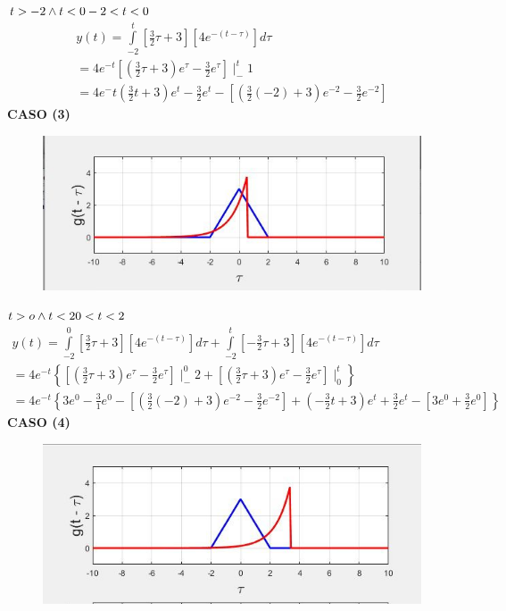 \documentclass[11pt,letterpaper]{article}
\begin{document}
$t>-2 \wedge t<0\\
-2<t<0$
\begin{align}
y(t) = \overset{t}{\underset{-2}{\int }} \left[ \frac{3}{2} \tau + 3 \right] \left[ 4e^{-(t-\tau)} \right]d\tau\\
= 4e^{-t} \left[ \left( \frac{3}{2} \tau + 3 \right) e^\tau - \frac{3}{2} e^\tau \right] \mid^t _-1\\
= 4e^-t  \left( \frac{3}{2}t + 3 \right) e^t - \frac{3}{2} e^t - \left[ \left( \frac{3}{2} (-2) + 3  \right) e^{-2} - \frac{3}{2} e^{-2}  \right]
\end{align}
\textbf{CASO (3)}\\
\begin{figure} [H]
\includegraphics[scale=0.5]{figura 5}
\end{figure}
$t>o \wedge t < 2\\
0<t<2$
\begin{align}
y(t) = \overset{0}{\underset{-2}{\int }} \left[ \frac{3}{2} \tau + 3 \right] \left[ 4e^{-(t-\tau)} \right]d\tau + \overset{t}{\underset{-2}{\int }} \left[ - \frac{3}{2} \tau + 3 \right] \left[ 4e^{-(t-\tau)} \right]d\tau\\
=4 e^{-t} \left\lbrace \left[ \left( \frac{3}{2} \tau + 3 \right) e^\tau - \frac{3}{2} e^\tau \right] \mid ^0 _-2 + \left[ \left( \frac{3}{2} \tau + 3 \right) e^\tau - \frac{3}{2} e^\tau \right]\mid ^t _0  \right\rbrace\\
=4 e^{-t} \left\lbrace 3 e^0 - \frac{3}{1} e^0 - \left[ \left( \frac{3}{2} (-2) +3 \right) e^{-2} - \frac{3}{2} e ^{-2} \right] + \left( - \frac{3}{2} t + 3 \right) e^t + \frac{3}{2}e^t - \left[ 3e^0 + \frac{3}{2} e^0 \right] \right\rbrace
\end{align}
\textbf{CASO (4)}
\begin{figure} [H]
\includegraphics[scale=0.5]{figura 6}
\end{figure}
\end{document}
